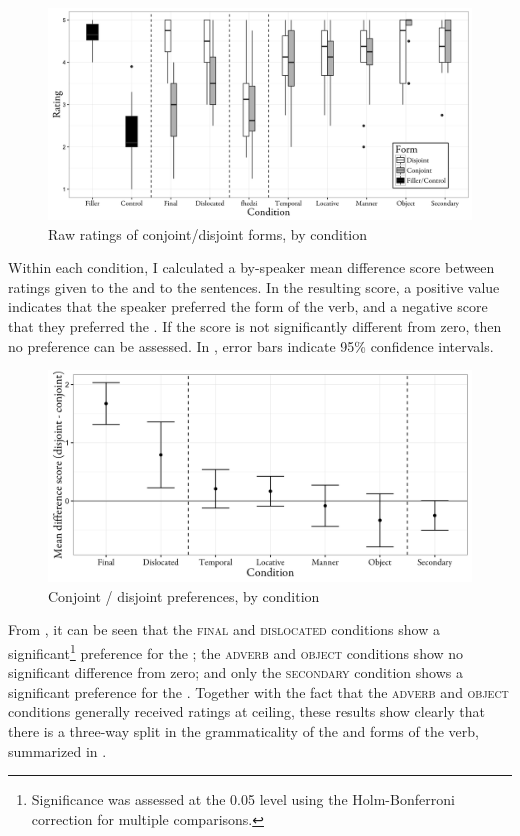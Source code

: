 \documentclass[output=paper,modfonts,nonflat,hidelinks]{langsci/langscibook}
\begin{document}
\begin{figure}[p]
	\caption{Raw ratings of conjoint\slash disjoint forms, by condition}
	\label{fig:kusmer:rawscores}
\includegraphics[width=\textwidth]{figures/proc-raw.png}
\end{figure}

Within each condition, I calculated a by-speaker mean difference score between
ratings given to the  and to the  sentences. In the resulting
score, a positive value indicates that the speaker preferred the  form
of the verb, and a negative score that they preferred the . If the score
is not significantly different from zero, then no preference can be assessed.
In , error bars indicate 95\% confidence intervals.


\begin{figure}[p]
	\caption{Conjoint / disjoint preferences, by condition}
	\label{fig:kusmer:meanscores}
\includegraphics[width=\textwidth]{figures/proc-results.png}
\end{figure}


From , it can be seen that the \textsc{final} and
\textsc{dislocated} conditions show a significant\footnote{Significance was
assessed at the 0.05 level using the Holm-Bonferroni correction for multiple
comparisons.} preference for the ; the \textsc{adverb} and
\textsc{object} conditions show no significant difference from zero; and only
the \textsc{secondary} condition shows a significant preference for the
. Together with the fact that the \textsc{adverb} and \textsc{object}
conditions generally received ratings at ceiling, these results show clearly
that there is a three-way split in the grammaticality of the  and
 forms of the verb, summarized in .
\end{document}
